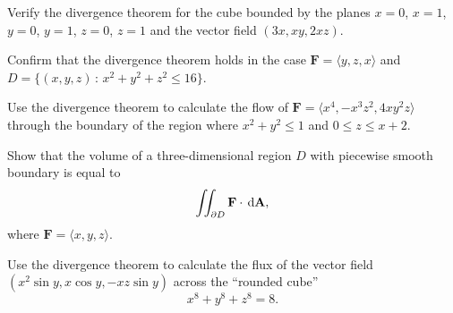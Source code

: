 \documentclass{watsonbook}
\begin{document}

\begin{aexercise}
  Verify the divergence theorem for the cube bounded by the planes
  $x=0$, $x=1$, $y=0$, $y=1$, $z=0$, $z=1$ and the vector field
  $(3x,xy,2xz)$.
\end{aexercise}

\begin{aexercise}
  Confirm that the divergence theorem holds in the case $\mathbf{F} =
  \langle y, z, x \rangle$ and $D = \{(x,y,z) \,: \, x^2 + y^2 + z^2
  \leq 16\}$. 
\end{aexercise}

\begin{aexercise}
  Use the divergence theorem to calculate the flow of $\mathbf{F} =
  \langle x^4, -x^3 z^2, 4xy^2 z \rangle$ through the boundary of the
  region where $x^2 + y^2 \leq 1$ and $0 \leq z
  \leq x + 2$. 
\end{aexercise}

\begin{aexercise}
  Show that the volume of a three-dimensional region $D$ with
  piecewise smooth boundary is equal to 
  \[
  \iint_{\partial D} \mathbf{F} \cdot \, {\mathrm{d}}\mathbf{A},
  \]
  where $\mathbf{F} =\langle x, y, z \rangle$. 
\end{aexercise}

\begin{aexercise}
  \begin{minipage}[t]{0.7\linewidth}
    Use the divergence theorem to calculate the flux of the vector
    field $(x^2 \sin y, x \cos y, -xz \sin y)$ across the ``rounded
    cube'' \[x^8 + y^8 + z^8 = 8.\]
  \end{minipage} 
  \begin{minipage}[t]{0.3\linewidth}
    \begin{center}
    \end{center}
  \end{minipage}
\end{aexercise}
\end{document}
